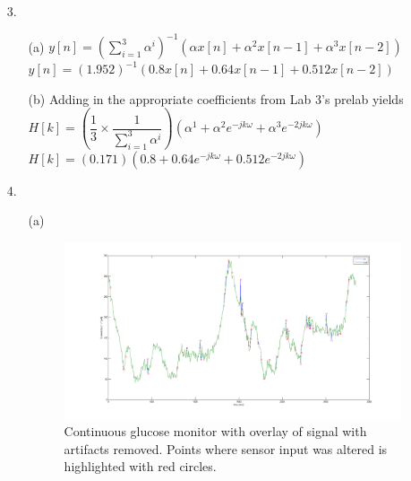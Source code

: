 \documentclass{article}
\begin{document}
\begin{enumerate}
\begin{enumerate}
	\end{enumerate}

\newpage

\item[3.]
	\begin{enumerate}
	\item[(a)]
		$y\left[n\right] = \left(\displaystyle\sum_{i=1}^{3} \alpha^i\right)^{-1} \left(\alpha x[n] + \alpha^2 x[n-1] + \alpha^3 x[n-2]\right)$\\
		
		$y\left[n\right] = \left(1.952\right)^{-1} \left(0.8 x[n] + 0.64 x[n-1] + 0.512 x[n-2]\right)$

\bigskip

	\item[(b)]
		Adding in the appropriate coefficients from Lab 3's prelab yields\\
		
		$H\left[k\right] = \left(\dfrac{1}{3} \times \dfrac{1}{\sum_{i=1}^{3} \alpha^i}\right) \left(\alpha^1 + \alpha^2 e^{-jk\omega} + \alpha^3 e^{-2jk\omega}\right)$\\
		
		$H\left[k\right] = \left(0.171\right) \left(0.8 + 0.64 e^{-jk\omega} + 0.512 e^{-2jk\omega}\right)$
	\end{enumerate}

\newpage

\item[4.]
	\begin{enumerate}
	\item[(a)] $\:$ \\
		\begin{figure}[!htb]
		\minipage{\textwidth}
		  \includegraphics[width=\linewidth]{../images/Problem4Graph.png}
		  \caption{Continuous glucose monitor with overlay of signal with artifacts removed. Points where sensor input was altered is highlighted with red circles.}
		\endminipage\hfill
		\end{figure}


\end{enumerate}
\end{enumerate}
\end{document}
